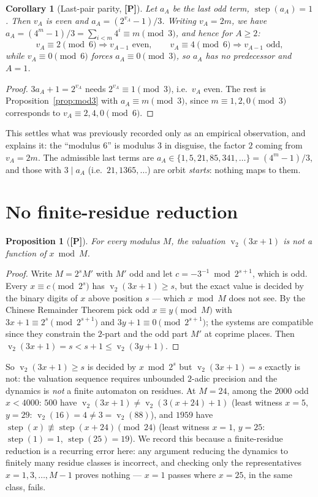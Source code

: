 \documentclass[11pt,a4paper]{article}
\theoremstyle{plain}
\newtheorem{proposition}[theorem]{Proposition}
\newtheorem{corollary}[theorem]{Corollary}
\theoremstyle{definition}
\newcommand{\val}{\operatorname{v}_2}
\newcommand{\step}{\operatorname{step}}
\begin{document}
\begin{corollary}[Last-pair parity, {\bf[P]}]\label{cor:lastpair}
Let $a_A$ be the last odd term, $\step(a_A)=1$. Then $v_A$ is even and
$a_A=(2^{v_A}-1)/3$. Writing $v_A=2m$, we have $a_A=(4^m-1)/3=\sum_{i<m}4^i\equiv m\pmod3$,
and hence for $A\ge2$:
\[
  v_A\equiv2\!\!\pmod 6\Rightarrow v_{A-1}\text{ even},\qquad
  v_A\equiv4\!\!\pmod 6\Rightarrow v_{A-1}\text{ odd},
\]
while $v_A\equiv0\pmod 6$ forces $a_A\equiv0\pmod3$, so $a_A$ has no predecessor and $A=1$.
\end{corollary}
\begin{proof}
$3a_A+1=2^{v_A}$ needs $2^{v_A}\equiv1\pmod3$, i.e.\ $v_A$ even. The rest is
Proposition~\ref{prop:mod3} with $a_A\equiv m\pmod 3$, since $m\equiv1,2,0\pmod3$
corresponds to $v_A\equiv2,4,0\pmod6$.
\end{proof}
\noindent This settles what was previously recorded only as an empirical observation, and
explains it: the ``modulus $6$'' is modulus $3$ in disguise, the factor $2$ coming from
$v_A=2m$. The admissible last terms are $a_A\in\{1,5,21,85,341,\dots\}=(4^m-1)/3$, and those
with $3\mid a_A$ (i.e.\ $21,1365,\dots$) are orbit \emph{starts}: nothing maps to them.

\section{No finite-residue reduction}\label{sec:nofinite}
\begin{proposition}[{\bf[P]}]\label{prop:nofinite}
For every modulus $M$, the valuation $\val(3x+1)$ is \emph{not} a function of $x\bmod M$.
\end{proposition}
\begin{proof}
Write $M=2^{s}M'$ with $M'$ odd and let $c=-3^{-1}\bmod 2^{s+1}$, which is odd. Every
$x\equiv c\pmod{2^{s}}$ has $\val(3x+1)\ge s$, but the exact value is decided by the binary
digits of $x$ above position $s$ --- which $x\bmod M$ does not see. By the Chinese Remainder
Theorem pick odd $x\equiv y\pmod{M}$ with $3x+1\equiv2^{s}\pmod{2^{s+1}}$ and
$3y+1\equiv0\pmod{2^{s+1}}$; the systems are compatible since they constrain the $2$-part and
the odd part $M'$ at coprime places. Then $\val(3x+1)=s<s+1\le\val(3y+1)$.
\end{proof}
\noindent So $\val(3x+1)\ge s$ is decided by $x\bmod2^{s}$ but $\val(3x+1)=s$ exactly is not:
the valuation sequence requires unbounded $2$-adic precision and the dynamics is \emph{not} a
finite automaton on residues. At $M=24$, among the $2000$ odd $x<4000$: $500$ have
$\val(3x+1)\ne\val(3(x+24)+1)$ (least witness $x=5$, $y=29$: $\val(16)=4\ne3=\val(88)$), and
$1959$ have $\step(x)\not\equiv\step(x+24)\pmod{24}$ (least witness $x=1$, $y=25$:
$\step(1)=1$, $\step(25)=19$). We record this because a finite-residue reduction is a
recurring error here: any argument reducing the dynamics to finitely many residue classes is
incorrect, and checking only the representatives $x=1,3,\dots,M-1$ proves nothing --- $x=1$
passes where $x=25$, in the same class, fails.
\end{document}
